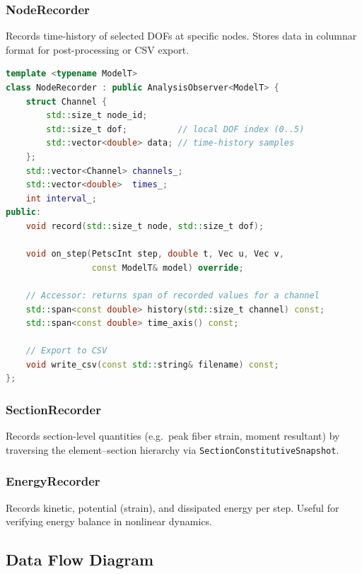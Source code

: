 \subsubsection{NodeRecorder}

Records time-history of selected DOFs at specific nodes.  Stores data
in columnar format for post-processing or CSV export.

\begin{lstlisting}[language=C++,basicstyle=\ttfamily\small]
template <typename ModelT>
class NodeRecorder : public AnalysisObserver<ModelT> {
    struct Channel {
        std::size_t node_id;
        std::size_t dof;          // local DOF index (0..5)
        std::vector<double> data; // time-history samples
    };
    std::vector<Channel> channels_;
    std::vector<double>  times_;
    int interval_;
public:
    void record(std::size_t node, std::size_t dof);

    void on_step(PetscInt step, double t, Vec u, Vec v,
                 const ModelT& model) override;

    // Accessor: returns span of recorded values for a channel
    std::span<const double> history(std::size_t channel) const;
    std::span<const double> time_axis() const;

    // Export to CSV
    void write_csv(const std::string& filename) const;
};
\end{lstlisting}

\subsubsection{SectionRecorder}

Records section-level quantities (e.g.\ peak fiber strain, moment
resultant) by traversing the element--section hierarchy via
\texttt{SectionConstitutiveSnapshot}.

\subsubsection{EnergyRecorder}

Records kinetic, potential (strain), and dissipated energy per step.
Useful for verifying energy balance in nonlinear dynamics.


\subsection{Data Flow Diagram}


